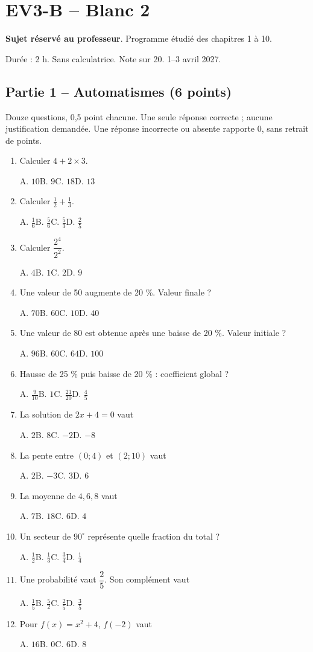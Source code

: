 \clearpage\section*{EV3-B -- Blanc 2}\label{EV3-B}
\textbf{Sujet réservé au professeur}. Programme étudié des chapitres 1 à 10.\par Durée : 2 h. Sans calculatrice. Note sur 20. 1–3 avril 2027.
\subsection*{Partie 1 -- Automatismes (6 points)}
Douze questions, 0,5 point chacune. Une seule réponse correcte ; aucune justification demandée. Une réponse incorrecte ou absente rapporte 0, sans retrait de points.
\begin{enumerate}
\item Calculer $4+2\times3$.\par A. $10$\quad B. $9$\quad C. $18$\quad D. $13$
\item Calculer $\frac12+\frac13$.\par A. $\frac{1}{6}$\quad B. $\frac{5}{6}$\quad C. $\frac{5}{3}$\quad D. $\frac{2}{5}$
\item Calculer $\dfrac{2^4}{2^{2}}$.\par A. $4$\quad B. $1$\quad C. $2$\quad D. $9$
\item Une valeur de 50 augmente de 20 \%. Valeur finale ?\par A. $70$\quad B. $60$\quad C. $10$\quad D. $40$
\item Une valeur de 80 est obtenue après une baisse de 20 \%. Valeur initiale ?\par A. $96$\quad B. $60$\quad C. $64$\quad D. $100$
\item Hausse de 25 \% puis baisse de 20 \% : coefficient global ?\par A. $\frac{9}{10}$\quad B. $1$\quad C. $\frac{21}{20}$\quad D. $\frac{4}{5}$
\item La solution de $2x+4=0$ vaut\par A. $2$\quad B. $8$\quad C. $-2$\quad D. $-8$
\item La pente entre $(0;4)$ et $(2;10)$ vaut\par A. $2$\quad B. $-3$\quad C. $3$\quad D. $6$
\item La moyenne de $4, 6, 8$ vaut\par A. $7$\quad B. $18$\quad C. $6$\quad D. $4$
\item Un secteur de $90^\circ$ représente quelle fraction du total ?\par A. $\frac{1}{2}$\quad B. $\frac{1}{3}$\quad C. $\frac{3}{4}$\quad D. $\frac{1}{4}$
\item Une probabilité vaut $\dfrac{2}{5}$. Son complément vaut\par A. $\frac{1}{5}$\quad B. $\frac{5}{2}$\quad C. $\frac{2}{5}$\quad D. $\frac{3}{5}$
\item Pour $f(x)=x^2+4$, $f(-2)$ vaut\par A. $16$\quad B. $0$\quad C. $6$\quad D. $8$
\end{enumerate}
